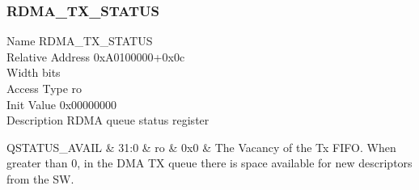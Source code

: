\documentclass[10pt,a4paper]{paper}
\begin{document}
\subsubsection{RDMA\_TX\_STATUS} \label{reg:rdma_tx_status}
\begin{regdescription}
	Name			\> RDMA\_TX\_STATUS\\
	Relative Address	\> 0xA0100000+0x0c\\
	Width			 bits\\
	Access Type		\> ro\\
	Init Value		\> 0x00000000\\
	Description		\> RDMA queue status register\\
\end{regdescription}
\begin{regdetails}
	\hline QSTATUS\_AVAIL & 31:0 & ro & 0x0 & The Vacancy of the Tx FIFO. When greater than 0, in the DMA TX
	queue there is space available for new descriptors from the SW.\\
\end{regdetails}
\end{document}
